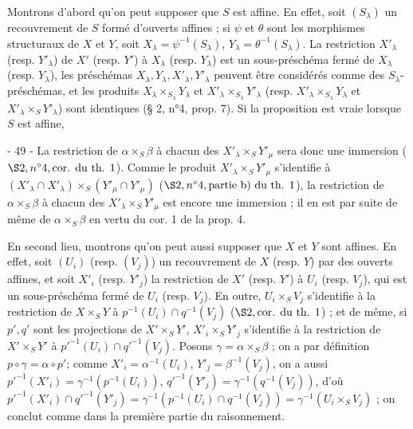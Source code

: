 Montrons d'abord qu'on peut supposer que $S$ est affine. En effet, soit $(S_\lambda)$ un recouvrement de $S$ formé d'ouverts affines ; si $\psi$ et $\theta$ sont les morphismes structuraux de $X$ et $Y$, soit $X_\lambda = \psi^{-1}(S_\lambda)$, $Y_\lambda = \theta^{-1}(S_\lambda)$. La restriction $X'_\lambda$ (resp. $Y'_\lambda$) de $X'$ (resp. $Y'$) à $X_\lambda$ (resp. $Y_\lambda$) est un sous-préschéma fermé de $X_\lambda$ (resp. $Y_\lambda$), les préschémas $X_\lambda, Y_\lambda, X'_\lambda, Y'_\lambda$ peuvent être considérés comme des $S_\lambda$-préschémas, et les produits $X_\lambda \times_{S_\lambda} Y_\lambda$ et $X'_\lambda \times_{S_\lambda} Y'_\lambda$ (resp. $X'_\lambda \times_{S_\lambda} Y_\lambda$ et $X'_\lambda \times_S Y'_\lambda$) sont identiques (§ 2, n°4, prop. 7). Si la proposition est vraie lorsque $S$ est affine,

\newpage


- 49 -
La restriction de $\alpha \times_S \beta$ à chacun des $X'_\lambda \times_S Y'_\mu$ sera donc une immersion ($\S 2, n^\circ 4, \text{cor. du th. 1}$). Comme le produit $X'_\lambda \times_S Y'_\mu$ s'identifie à $(X'_\lambda \cap X'_\lambda) \times_S (Y'_\mu \cap Y'_\mu)$ ($\S 2, n^\circ 4, \text{partie b) du th. 1}$), la restriction de $\alpha \times_S \beta$ à chacun des $X'_\lambda \times_S Y'_\mu$ est encore une immersion ; il en est par suite de même de $\alpha \times_S \beta$ en vertu du cor. 1 de la prop. 4.

En second lieu, montrons qu'on peut aussi supposer que $X$ et $Y$ sont affines. En effet, soit $(U_i)$ (resp. $(V_j)$) un recouvrement de $X$ (resp. $Y$) par des ouverts affines, et soit $X'_i$ (resp. $Y'_j$) la restriction de $X'$ (resp. $Y'$) à $U_i$ (resp. $V_j$), qui est un sous-préschéma fermé de $U_i$ (resp. $V_j$). En outre, $U_i \times_S V_j$ s'identifie à la restriction de $X \times_S Y$ à $p^{-1}(U_i) \cap q^{-1}(V_j)$ ($\S 2, \text{cor. du th. 1}$) ; et de même, si $p', q'$ sont les projections de $X' \times_S Y'$, $X'_i \times_S Y'_j$ s'identifie à la restriction de $X' \times_S Y'$ à $p'^{-1}(U_i) \cap q'^{-1}(V_j)$. Posons $\gamma = \alpha \times_S \beta$ ; on a par définition $p \circ \gamma = \alpha \circ p'$; comme $X'_i = \alpha^{-1}(U_i)$, $Y'_j = \beta^{-1}(V_j)$, on a aussi $p'^{-1}(X'_i) = \gamma^{-1}(p^{-1}(U_i))$, $q'^{-1}(Y'_j) = \gamma^{-1}(q^{-1}(V_j))$, d'où $p'^{-1}(X'_i) \cap q'^{-1}(Y'_j) = \gamma^{-1}(p^{-1}(U_i) \cap q^{-1}(V_j)) = \gamma^{-1}(U_i \times_S V_j)$ ; on conclut comme dans la première partie du raisonnement.

